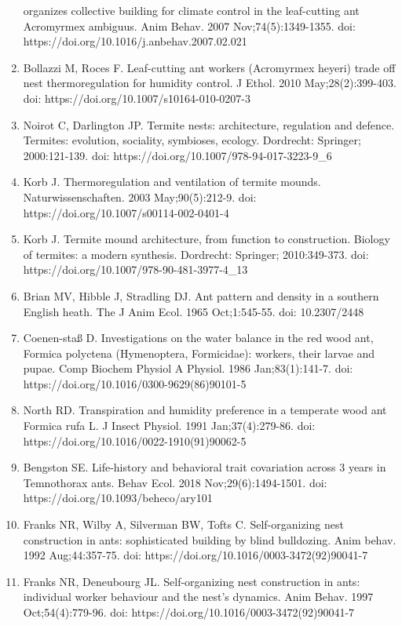 \documentclass[3p]{elsarticle} %
\begin{document}
\begin{enumerate}
  organizes collective building for climate control in the leaf-cutting
  ant Acromyrmex ambiguus. Anim Behav. 2007 Nov;74(5):1349-1355. doi:
  https://doi.org/10.1016/j.anbehav.2007.02.021
\item
  Bollazzi M, Roces F. Leaf-cutting ant workers (Acromyrmex heyeri)
  trade off nest thermoregulation for humidity control. J Ethol. 2010
  May;28(2):399-403. doi: https://doi.org/10.1007/s10164-010-0207-3
\item
  Noirot C, Darlington JP. Termite nests: architecture, regulation and
  defence. Termites: evolution, sociality, symbioses, ecology.
  Dordrecht: Springer; 2000:121-139. doi:
  https://doi.org/10.1007/978-94-017-3223-9\_6
\item
  Korb J. Thermoregulation and ventilation of termite mounds.
  Naturwissenschaften. 2003 May;90(5):212-9. doi:
  https://doi.org/10.1007/s00114-002-0401-4
\item
  Korb J. Termite mound architecture, from function to construction.
  Biology of termites: a modern synthesis. Dordrecht: Springer;
  2010:349-373. doi: https://doi.org/10.1007/978-90-481-3977-4\_13
\item
  Brian MV, Hibble J, Stradling DJ. Ant pattern and density in a
  southern English heath. The J Anim Ecol. 1965 Oct;1:545-55. doi:
  10.2307/2448
\item
  Coenen-staß D. Investigations on the water balance in the red wood
  ant, Formica polyctena (Hymenoptera, Formicidae): workers, their
  larvae and pupae. Comp Biochem Physiol A Physiol. 1986
  Jan;83(1):141-7. doi: https://doi.org/10.1016/0300-9629(86)90101-5
\item
  North RD. Transpiration and humidity preference in a temperate wood
  ant Formica rufa L. J Insect Physiol. 1991 Jan;37(4):279-86. doi:
  https://doi.org/10.1016/0022-1910(91)90062-5
\item
  Bengston SE. Life-history and behavioral trait covariation across 3
  years in Temnothorax ants. Behav Ecol. 2018 Nov;29(6):1494-1501. doi:
  https://doi.org/10.1093/beheco/ary101
\item
  Franks NR, Wilby A, Silverman BW, Tofts C. Self-organizing nest
  construction in ants: sophisticated building by blind bulldozing. Anim
  behav. 1992 Aug;44:357-75. doi:
  https://doi.org/10.1016/0003-3472(92)90041-7
\item
  Franks NR, Deneubourg JL. Self-organizing nest construction in ants:
  individual worker behaviour and the nest's dynamics. Anim Behav. 1997
  Oct;54(4):779-96. doi: https://doi.org/10.1016/0003-3472(92)90041-7

\end{enumerate}
\end{document}
